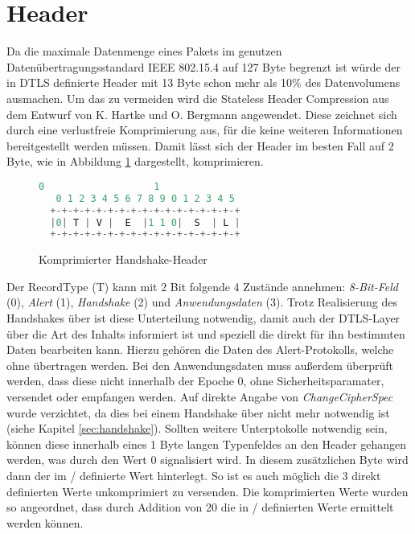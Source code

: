 \section{Header}
\label{sec:headercompression}

Da die maximale Datenmenge eines Pakets im genutzen Datenübertragungsstandard IEEE 802.15.4 \cite{ieee802154} auf 127 Byte begrenzt ist würde der in DTLS
definierte Header mit 13 Byte schon mehr als 10\% des Datenvolumens ausmachen. Um das zu vermeiden wird die Stateless Header Compression aus dem Entwurf
von K. Hartke und O. Bergmann \cite[Kapitel 3]{draftcodtls} angewendet. Diese zeichnet sich durch eine verlustfreie Komprimierung aus, für die keine weiteren
Informationen bereitgestellt werden müssen. Damit lässt sich der Header im besten Fall auf 2 Byte, wie in Abbildung \ref{fig:com_handshake_header} dargestellt,
komprimieren.

\begin{figure}[ht]
  \centering
  \begin{lstlisting}[language=c]
   0                   1
   0 1 2 3 4 5 6 7 8 9 0 1 2 3 4 5
  +-+-+-+-+-+-+-+-+-+-+-+-+-+-+-+-+
  |0| T | V |  E  |1 1 0|  S  | L |
  +-+-+-+-+-+-+-+-+-+-+-+-+-+-+-+-+
  \end{lstlisting}
  \caption{Komprimierter Handshake-Header}
  \label{fig:com_handshake_header}
\end{figure}

Der RecordType (T) kann mit 2 Bit folgende 4 Zustände annehmen: \textit{8-Bit-Feld} (0), \textit{Alert} (1), \textit{Handshake} (2) und
\textit{Anwendungsdaten} (3). Trotz Realisierung des Handshakes über  ist diese Unterteilung notwendig, damit auch der DTLS-Layer über die
Art des Inhalts informiert ist und speziell die direkt für ihn bestimmten Daten bearbeiten kann. Hierzu gehören die Daten des Alert-Protokolls,
welche ohne  übertragen werden. Bei den Anwendungsdaten muss außerdem überprüft werden, dass diese nicht innerhalb der Epoche 0, ohne
Sicherheitsparamater, versendet oder empfangen werden. Auf direkte Angabe von \textit{ChangeCipherSpec} wurde verzichtet, da dies bei einem
Handshake über  nicht mehr notwendig ist (siehe Kapitel \ref{sec:handshake}). Sollten  weitere Unterptokolle notwendig sein, können
diese innerhalb eines 1 Byte langen Typenfeldes an den Header gehangen werden, was durch den Wert 0 signalisiert wird. In diesem zusätzlichen
Byte wird dann der im / definierte Wert hinterlegt. So ist es auch möglich die 3 direkt definierten Werte unkomprimiert zu
versenden. Die komprimierten Werte wurden so angeordnet, dass durch Addition von 20 die in / definierten Werte ermittelt werden können.

